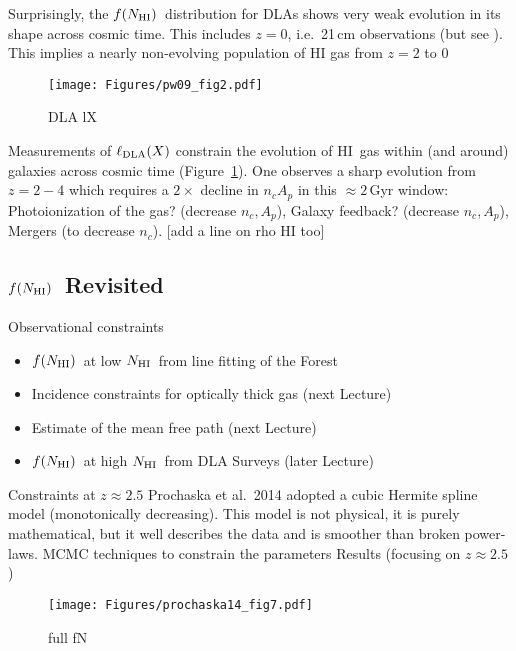 \documentclass[graybox]{svmult}
\newcommand{\HI}{H{\sc I}}
\newcommand{\mnhi}{N_{\rm HI}}
\newcommand{\nhi}{$\mnhi$}
\def\mfnhi{f(\mnhi)}
\def\fnhi{$\mfnhi$}
\begin{document}
Surprisingly, the \fnhi\ distribution for DLAs shows
very weak evolution in its shape across cosmic time.
This includes $z=0$, i.e.\ 21\,cm observations 
\cite{zwaan05} (but see \cite{braun12}).
This implies a nearly non-evolving population of HI gas from $z=2$ to 0

%
\begin{figure}[b]
\sidecaption
\texttt{[image: Figures/pw09\_fig2.pdf]}
%
%
\caption{DLA lX
}
\label{fig:pw09}       %
\end{figure}
  
Measurements of $\ell_{\rm DLA} (X)$ constrain the evolution of 
\HI\ gas within (and around) galaxies across cosmic time
(Figure~\ref{fig:pw09}).
One observes a  sharp evolution from $z=2-4$ which
requires a $2\times$ decline in $n_c A_p$ in this
$\approx 2$\,Gyr window:
Photoionization of the gas? (decrease $n_c, A_p$),
Galaxy feedback? (decrease $n_c, A_p$),
Mergers (to decrease $n_c$).
[add a line on rho HI too]

\subsection{\fnhi\ Revisited}


Observational constraints
		\begin{itemize}
		\item \fnhi\ at low \nhi\ from line fitting of the Forest
		\item Incidence constraints for optically thick gas (next Lecture)
		\item Estimate of the mean free path (next Lecture)
		\item \fnhi\ at high \nhi\ from DLA Surveys (later Lecture)
		\end{itemize}
Constraints at $z \approx 2.5$
Prochaska et al.\ 2014
adopted a cubic Hermite spline model (monotonically decreasing).
This model is not physical, it is purely mathematical, 
but it well describes the data and is
smoother than broken power-laws.
MCMC techniques to constrain the parameters
Results (focusing on $z \approx 2.5$)

%
\begin{figure}[b]
\sidecaption
\texttt{[image: Figures/prochaska14\_fig7.pdf]}
%
%
\caption{full fN
}
\label{fig:full_fN}       %
\end{figure}
\end{document}

